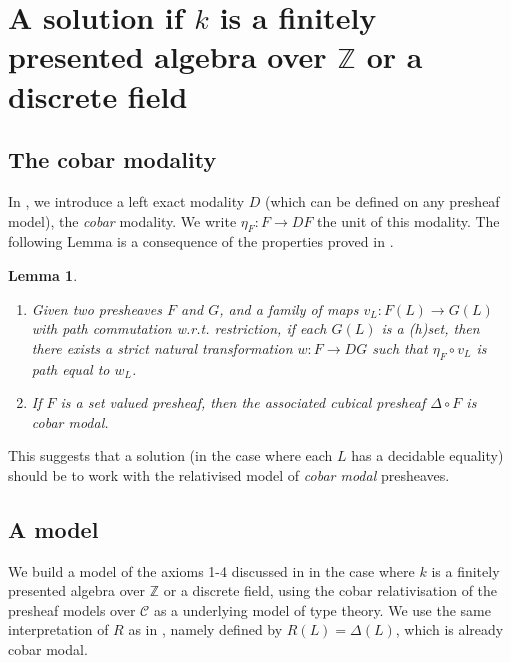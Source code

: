 \documentclass[10pt,a4paper]{article}
\newtheorem{lemma}[theorem]{Lemma}
\theoremstyle{definition}
\theoremstyle{remark}
\newcommand{\ints}{\mathbb{Z}}
\newcommand{\CC}{\mathcal{C}}
\begin{document}
\section{A solution if $k$ is a finitely presented algebra over $\ints$ or a discrete field}

\subsection{The cobar modality}

In \cite{CRS21}, we introduce a left exact modality \cite{modalities}
$D$ (which can be defined on any presheaf model), the {\em cobar} modality. We write $\eta_F:F \rightarrow DF$
the unit of this modality. The following Lemma is a consequence of the properties proved in \cite{CRS21}.

\begin{lemma}
  \begin{enumerate}
   \item Given two presheaves $F$ and $G$, and a family of maps $v_L:F(L)\rightarrow G(L)$ with {\em path} commutation w.r.t. restriction, {\em if} each $G(L)$
is a (h)set, then there exists a {\em strict} natural transformation $w:F\rightarrow DG$ such that $\eta_F\circ v_L$ is path equal to $w_L$.
    \item If $F$ is a set valued presheaf, then the associated cubical presheaf $\Delta \circ F$ is cobar modal.
  \end{enumerate}
\end{lemma}

This suggests that a solution (in the case where each $L$ has a decidable equality) should be to work with the relativised model of
{\em cobar modal} presheaves.

\subsection{A model}

We build a model of the axioms 1-4 discussed in \cite{draft} in the case where $k$
is a finitely presented algebra over $\ints$ or a discrete field, using the cobar relativisation of the presheaf models over $\CC$
as a underlying model of type theory.
We use the same interpretation of $R$ as in \cite{draft}, namely defined by $R(L) = \Delta(L)$, which is already cobar modal.
\end{document}
